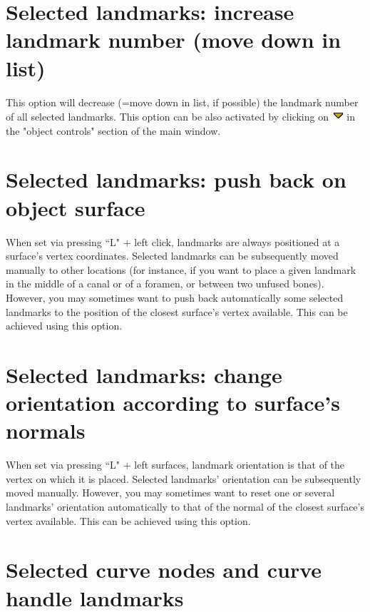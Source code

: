 \section{Selected landmarks: increase landmark number (move down in list)}
 This option will decrease (=move down in list, if possible) the landmark number of all selected landmarks.
This option can be also activated by clicking on \includegraphics[scale=0.7]{images/06/objects/move_down.png} in the "object controls" section of the main window.

\section{Selected landmarks: push back on object surface}
When set via pressing ``L" + left click, landmarks are always positioned at a surface's vertex coordinates. Selected
landmarks can be subsequently moved manually to other locations (for instance, if you want to place
a given landmark in the middle of a canal or of a foramen, or between two unfused bones). However,
you may sometimes want to push back automatically some selected landmarks to the position of the
closest surface's vertex available. This can be achieved using this option.

\section{Selected landmarks: change orientation according to surface's normals}
When set via pressing ``L" + left surfaces, landmark orientation is that of the vertex on which it is
placed. Selected landmarks' orientation can be subsequently moved manually. However, you may
sometimes want to reset one or several landmarks' orientation automatically to that of the normal of the closest
surface's vertex available. This can be achieved using this option.

\section{Selected curve nodes and curve handle landmarks}\label{landmarks_curves_section}


